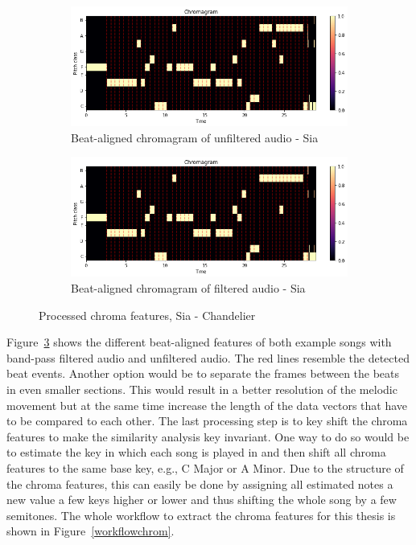 \begin{figure}[htbp]
{{			\begin{subfigure}{.495\textwidth}
				\centering    
				\includegraphics[scale=0.3]{Images/Chroma/siaunfiltered.png}
				\caption{Beat-aligned chromagram of unfiltered audio - Sia}
				\label{siaub}
			\end{subfigure}
			\begin{subfigure}{.495\textwidth}
				\centering     
				\includegraphics[scale=0.3]{Images/Chroma/siafiltered.png}
				\caption{Beat-aligned chromagram of filtered audio - Sia}
				\label{siafb}
			\end{subfigure}%
	}}
	\caption{Processed chroma features, Sia - Chandelier}
	\label{beataligned}
\end{figure}

\noindent Figure~\ref{beataligned} shows the different beat-aligned features of both example songs with band-pass filtered audio and unfiltered audio. The red lines resemble the detected beat events.
\noindent Another option would be to separate the frames between the beats in even smaller sections. This would result in a better resolution of the melodic movement but at the same time increase the length of the data vectors that have to be compared to each other.
\noindent The last processing step is to key shift the chroma features to make the similarity analysis key invariant. One way to do so would be to estimate the key in which each song is played in and then shift all chroma features to the same base key, e.g., C Major or A Minor. Due to the structure of the chroma features, this can easily be done by assigning all estimated notes a new value a few keys higher or lower and thus shifting the whole song by a few semitones. The whole workflow to extract the chroma features for this thesis is shown in Figure~\ref{workflowchrom}.\\

